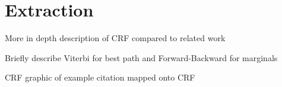 \section{Extraction}

More in depth description of CRF compared to related work \newline

\noindent Briefly describe Viterbi for best path and Forward-Backward for marginals \newline

\noindent CRF graphic of example citation mapped onto CRF




